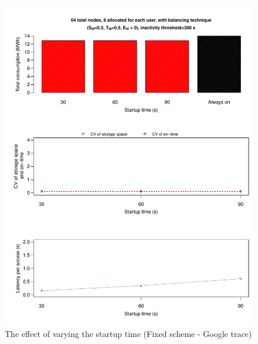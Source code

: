 \begin{figure}[!htbp]
\centering
\includegraphics[width=\columnwidth,keepaspectratio]{FIG7.pdf}
\caption{The effect of varying the startup time (Fixed scheme - Google trace)}
\label{secondresult}
\end{figure}

